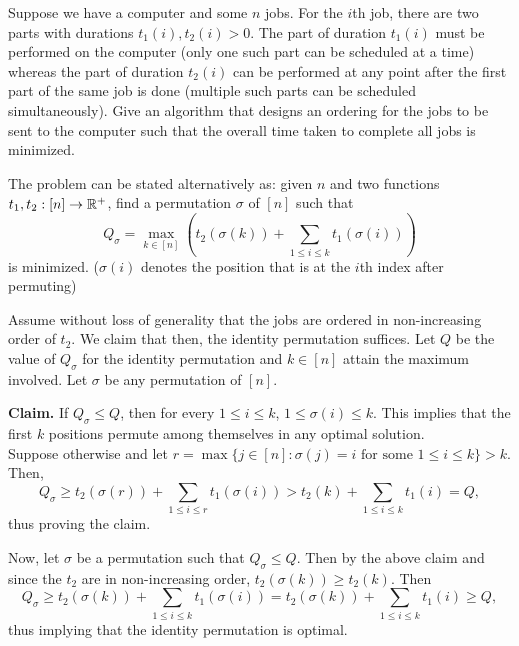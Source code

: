 \begin{exercise}
	Suppose we have a computer and some $n$ jobs. For the $i$th job, there are two parts with durations $t_{1}(i),t_{2}(i)>0$. The part of duration $t_{1}(i)$ must be performed on the computer (only one such part can be scheduled at a time) whereas the part of duration $t_{2}(i)$ can be performed at any point after the first part of the same job is done (multiple such parts can be scheduled simultaneously). Give an algorithm that designs an ordering for the jobs to be sent to the computer such that the overall time taken to complete all jobs is minimized.
\end{exercise}
\begin{solution*}
	The problem can be stated alternatively as: given $n$ and two functions $t_1,t_2:[n]\to\mathbb{R}^+$, find a permutation $\sigma$ of $[n]$ such that
	\[ Q_\sigma = \max_{k\in[n]} \left(t_2(\sigma(k)) + \sum_{1\leq i\leq k} t_1(\sigma(i))\right) \]
	is minimized. ($\sigma(i)$ denotes the position that is at the $i$th index after permuting)

	Assume without loss of generality that the jobs are ordered in non-increasing order of $t_2$. We claim that then, the identity permutation suffices. Let $Q$ be the value of $Q_\sigma$ for the identity permutation and $k\in[n]$ attain the maximum involved. Let $\sigma$ be any permutation of $[n]$.

	\textbf{Claim.} If $Q_\sigma\leq Q$, then for every $1\leq i\leq k$, $1\leq\sigma(i)\leq k$. This implies that the first $k$ positions permute among themselves in any optimal solution.\\
	Suppose otherwise and let $r=\max\{j\in[n] : \sigma(j)=i\text{ for some }1\leq i\leq k\}> k$. Then,
	\[ Q_\sigma \geq t_2(\sigma(r)) + \sum_{1\leq i\leq r} t_1(\sigma(i)) > t_2(k) + \sum_{1\leq i\leq k}t_1(i) = Q, \]
	thus proving the claim.

	Now, let $\sigma$ be a permutation such that $Q_\sigma \leq Q$. Then by the above claim and since the $t_2$ are in non-increasing order, $t_2(\sigma(k))\geq t_2(k)$. Then
	\[ Q_\sigma \geq t_2(\sigma(k)) + \sum_{1\leq i\leq k} t_1(\sigma(i)) = t_2(\sigma(k)) + \sum_{1\leq i\leq k} t_1(i) \geq Q, \]
	thus implying that the identity permutation is optimal. 
\end{solution*}

